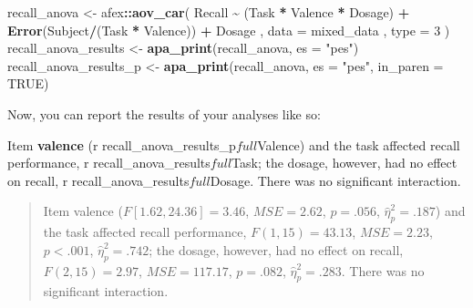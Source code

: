 \documentclass[
  man,floatsintext]{apa6}
\newenvironment{Shaded}{\begin{snugshade}}{\end{snugshade}}
\newcommand{\AttributeTok}[1]{\textcolor[rgb]{0.13,0.29,0.53}{#1}}
\newcommand{\ConstantTok}[1]{\textcolor[rgb]{0.56,0.35,0.01}{#1}}
\newcommand{\DecValTok}[1]{\textcolor[rgb]{0.00,0.00,0.81}{#1}}
\newcommand{\FunctionTok}[1]{\textcolor[rgb]{0.13,0.29,0.53}{\textbf{#1}}}
\newcommand{\NormalTok}[1]{#1}
\newcommand{\OtherTok}[1]{\textcolor[rgb]{0.56,0.35,0.01}{#1}}
\newcommand{\SpecialCharTok}[1]{\textcolor[rgb]{0.81,0.36,0.00}{\textbf{#1}}}
\newcommand{\StringTok}[1]{\textcolor[rgb]{0.31,0.60,0.02}{#1}}
\begin{document}
\begin{Shaded}
\begin{Highlighting}[]
\NormalTok{recall\_anova }\OtherTok{\textless{}{-}}\NormalTok{ afex}\SpecialCharTok{::}\FunctionTok{aov\_car}\NormalTok{(}
\NormalTok{  Recall }\SpecialCharTok{\textasciitilde{}}\NormalTok{ (Task }\SpecialCharTok{*}\NormalTok{ Valence }\SpecialCharTok{*}\NormalTok{ Dosage) }\SpecialCharTok{+} \FunctionTok{Error}\NormalTok{(Subject}\SpecialCharTok{/}\NormalTok{(Task }\SpecialCharTok{*}\NormalTok{ Valence)) }\SpecialCharTok{+}\NormalTok{ Dosage}
\NormalTok{  , }\AttributeTok{data =}\NormalTok{ mixed\_data}
\NormalTok{  , }\AttributeTok{type =} \DecValTok{3}
\NormalTok{)}
\NormalTok{recall\_anova\_results }\OtherTok{\textless{}{-}} \FunctionTok{apa\_print}\NormalTok{(recall\_anova, }\AttributeTok{es =} \StringTok{"pes"}\NormalTok{)}
\NormalTok{recall\_anova\_results\_p }\OtherTok{\textless{}{-}} \FunctionTok{apa\_print}\NormalTok{(recall\_anova, }\AttributeTok{es =} \StringTok{"pes"}\NormalTok{, }\AttributeTok{in\_paren =} \ConstantTok{TRUE}\NormalTok{)}
\end{Highlighting}
\end{Shaded}

Now, you can report the results of your analyses like so:

\begin{Shaded}
\begin{Highlighting}[]
\NormalTok{Item }\FunctionTok{valence}\NormalTok{ (}\StringTok{\textasciigrave{}}\AttributeTok{r recall\_anova\_results\_p$full$Valence}\StringTok{\textasciigrave{}}\NormalTok{) and the task}
\NormalTok{affected recall performance, }\StringTok{\textasciigrave{}}\AttributeTok{r recall\_anova\_results$full$Task}\StringTok{\textasciigrave{}}\NormalTok{; the dosage,}
\NormalTok{however, had no effect on recall, }\StringTok{\textasciigrave{}}\AttributeTok{r recall\_anova\_results$full$Dosage}\StringTok{\textasciigrave{}}\NormalTok{.}
\NormalTok{There was no significant interaction.}
\end{Highlighting}
\end{Shaded}

\begin{quote}
Item valence (\(F[1.62, 24.36] = 3.46\), \(\mathit{MSE} = 2.62\), \(p = .056\), \(\hat{\eta}^2_p = .187\)) and the task affected recall performance, \(F(1, 15) = 43.13\), \(\mathit{MSE} = 2.23\), \(p < .001\), \(\hat{\eta}^2_p = .742\);
the dosage, however, had no effect on recall, \(F(2, 15) = 2.97\), \(\mathit{MSE} = 117.17\), \(p = .082\), \(\hat{\eta}^2_p = .283\).
There was no significant interaction.
\end{quote}
\end{document}
